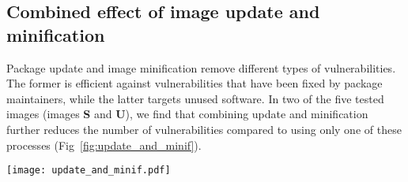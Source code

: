 \subsection{Combined effect of image update and  minification}

Package update and image minification remove different types of
vulnerabilities. The former is efficient against vulnerabilities that have
been fixed by package maintainers, while the latter targets unused
software. In two of the five tested images (images \textbf{S} and \textbf{U}), we find that combining update
and minification further reduces the number of vulnerabilities compared to
using only one of these processes
(Fig~\ref{fig:update_and_minif}).

\begin{center}
\texttt{[image: update\_and\_minif.pdf]}
	\label{fig:update_and_minif}
\end{center}

